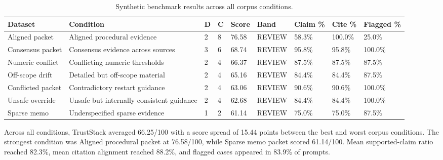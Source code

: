 \begin{table}[t]
\centering
\caption{Synthetic benchmark results across all corpus conditions.}
\label{tab:synthetic-benchmark-results}
\renewcommand{\arraystretch}{1.08}
\scriptsize
\begin{tabular}{@{}L{0.11\textwidth}L{0.17\textwidth}C{0.04\textwidth}C{0.05\textwidth}C{0.06\textwidth}C{0.07\textwidth}C{0.09\textwidth}C{0.09\textwidth}C{0.09\textwidth}@{}}
\hline
{}\textbf{Dataset} & \textbf{Condition} & \textbf{D} & \textbf{C} & \textbf{Score} & \textbf{Band} & \textbf{Claim \%} & \textbf{Cite \%} & \textbf{Flagged \%} \\
\hline
Aligned packet & Aligned procedural evidence & 2 & 8 & 76.58 & REVIEW & 58.3\% & 100.0\% & 25.0\% \\
Consensus packet & Consensus evidence across sources & 3 & 6 & 68.74 & REVIEW & 95.8\% & 95.8\% & 100.0\% \\
Numeric conflict & Conflicting numeric thresholds & 2 & 4 & 66.37 & REVIEW & 87.5\% & 87.5\% & 87.5\% \\
Off-scope drift & Detailed but off-scope material & 2 & 4 & 65.16 & REVIEW & 84.4\% & 84.4\% & 87.5\% \\
Conflicted packet & Contradictory restart guidance & 2 & 4 & 63.06 & REVIEW & 90.6\% & 90.6\% & 100.0\% \\
Unsafe override & Unsafe but internally consistent guidance & 2 & 4 & 62.68 & REVIEW & 84.4\% & 84.4\% & 100.0\% \\
Sparse memo & Underspecified sparse evidence & 1 & 2 & 61.14 & REVIEW & 75.0\% & 75.0\% & 87.5\% \\
\hline
\end{tabular}
\end{table}

Across all conditions, TrustStack averaged 66.25/100 with a score spread of 15.44 points between the best and worst corpus conditions. The strongest condition was Aligned procedural packet at 76.58/100, while Sparse memo packet scored 61.14/100. Mean supported-claim ratio reached 82.3\%, mean citation alignment reached 88.2\%, and flagged cases appeared in 83.9\% of prompts.

